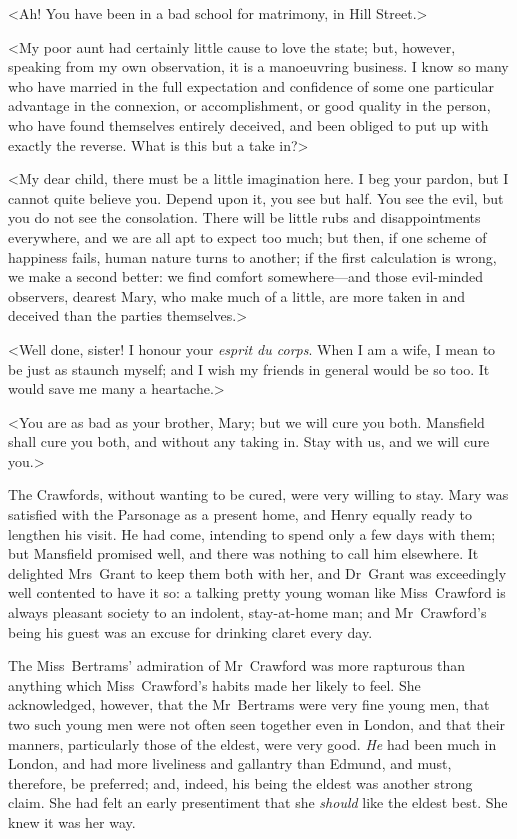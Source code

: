 <Ah! You have been in a bad school for matrimony, in Hill Street.>

<My poor aunt had certainly little cause to love the state; but, however, speaking from my own observation, it is a manoeuvring business. I know so many who have married in the full expectation and confidence of some one particular advantage in the connexion, or accomplishment, or good quality in the person, who have found themselves entirely deceived, and been obliged to put up with exactly the reverse. What is this but a take in?>

<My dear child, there must be a little imagination here. I beg your pardon, but I cannot quite believe you. Depend upon it, you see but half. You see the evil, but you do not see the consolation. There will be little rubs and disappointments everywhere, and we are all apt to expect too much; but then, if one scheme of happiness fails, human nature turns to another; if the first calculation is wrong, we make a second better: we find comfort somewhere—and those evil-minded observers, dearest Mary, who make much of a little, are more taken in and deceived than the parties themselves.>

<Well done, sister! I honour your \textit{esprit du corps}. When I am a wife, I mean to be just as staunch myself; and I wish my friends in general would be so too. It would save me many a heartache.>

<You are as bad as your brother, Mary; but we will cure you both. Mansfield shall cure you both, and without any taking in. Stay with us, and we will cure you.>

The Crawfords, without wanting to be cured, were very willing to stay. Mary was satisfied with the Parsonage as a present home, and Henry equally ready to lengthen his visit. He had come, intending to spend only a few days with them; but Mansfield promised well, and there was nothing to call him elsewhere. It delighted Mrs~Grant to keep them both with her, and Dr~Grant was exceedingly well contented to have it so: a talking pretty young woman like Miss~Crawford is always pleasant society to an indolent, stay-at-home man; and Mr~Crawford's being his guest was an excuse for drinking claret every day.

The Miss~Bertrams' admiration of Mr~Crawford was more rapturous than anything which Miss~Crawford's habits made her likely to feel. She acknowledged, however, that the Mr~Bertrams were very fine young men, that two such young men were not often seen together even in London, and that their manners, particularly those of the eldest, were very good. \textit{He}  had been much in London, and had more liveliness and gallantry than Edmund, and must, therefore, be preferred; and, indeed, his being the eldest was another strong claim. She had felt an early presentiment that she \textit{should}  like the eldest best. She knew it was her way.

